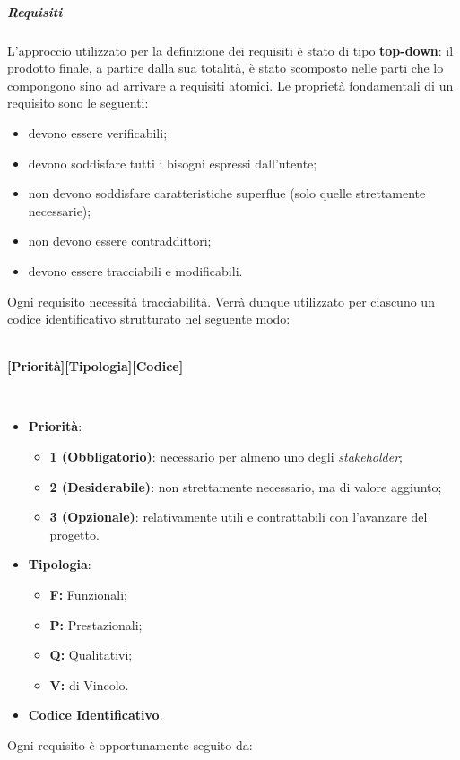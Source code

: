 \subparagraph*{Requisiti}
L'approccio utilizzato per la definizione dei requisiti è stato di tipo \textbf{top-down}: il prodotto finale, a partire dalla sua totalità, è stato scomposto nelle parti che lo compongono sino ad arrivare a requisiti atomici. Le proprietà fondamentali di un requisito sono le seguenti:
\begin{itemize}
	\item devono essere verificabili;
	\item devono soddisfare tutti i bisogni espressi dall'utente;
	\item non devono soddisfare caratteristiche superflue (solo quelle strettamente necessarie);
	\item non devono essere contraddittori;
	\item devono essere tracciabili e modificabili.
\end{itemize}  
\noindent Ogni requisito necessità tracciabilità. Verrà dunque utilizzato per ciascuno un codice identificativo strutturato nel seguente modo:
\\\\
\centerline{\textbf{[Priorità][Tipologia][Codice]}}\\
\begin{itemize}
  \item \textbf{Priorità}:
  \begin{itemize}
    \item \textbf{1 (Obbligatorio)}: necessario per almeno uno degli \textit{stakeholder\glos};
    \item \textbf{2 (Desiderabile)}: non strettamente necessario, ma di valore aggiunto;
    \item \textbf{3 (Opzionale)}: relativamente utili e contrattabili con l'avanzare del progetto.
  \end{itemize}
  \item \textbf{Tipologia}:
  \begin{itemize}
    \item \textbf{F:} Funzionali;
    \item \textbf{P:} Prestazionali;
    \item \textbf{Q:} Qualitativi;
    \item \textbf{V:} di Vincolo.
  \end{itemize}
  \item \textbf{Codice Identificativo}.
\end{itemize}
Ogni requisito è opportunamente seguito da:
